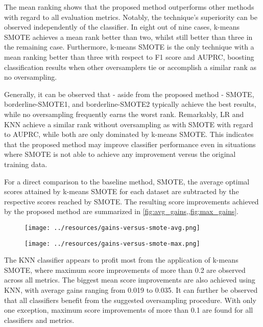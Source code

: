 \documentclass[sort&compress]{elsarticle}
\begin{document}
The mean ranking shows that the proposed method outperforms other methods with regard to all evaluation metrics. Notably, the technique's superiority can be observed independently of the classifier. In eight out of nine cases, k-means \ac{SMOTE} achieves a mean rank better than two, whilst still better than three in the remaining case. Furthermore, k-means \ac{SMOTE} is the only technique with a mean ranking better than three with respect to F1 score and \ac{AUPRC}, boosting classification results when other oversamplers tie or accomplish a similar rank as no oversampling.

Generally, it can be observed that - aside from the proposed method - \ac{SMOTE}, borderline-\ac{SMOTE}1, and borderline-\ac{SMOTE}2 typically achieve the best results, while no oversampling frequently earns the worst rank. Remarkably, \ac{LR} and \ac{KNN} achieve a similar rank without oversampling as with \ac{SMOTE} with regard to \ac{AUPRC}, while both are only dominated by k-means \ac{SMOTE}. This indicates that the proposed method may improve classifier performance even in situations where \ac{SMOTE} is not able to achieve any improvement versus the original training data.

For a direct comparison to the baseline method, \ac{SMOTE}, the average optimal scores attained by k-means \ac{SMOTE} for each dataset are subtracted by the respective scores reached by \ac{SMOTE}. The resulting score improvements achieved by the proposed method are summarized in \cref{fig:avg_gains,,fig:max_gains}.

\begin{figure}[ht]
	\centering
	\begin{minipage}{.48\textwidth}
		\centering
		\texttt{[image: ../resources/gains-versus-smote-avg.png]}
		\label{fig:avg_gains}
	\end{minipage}%
	\hfill
	\begin{minipage}{.48\textwidth}
		\centering
		\texttt{[image: ../resources/gains-versus-smote-max.png]}
		\label{fig:max_gains}
	\end{minipage}
\end{figure}

The \ac{KNN} classifier appears to profit most from the application of k-means \ac{SMOTE}, where maximum score improvements of more than 0.2 are observed across all metrics. The biggest mean score improvements are also achieved using \ac{KNN}, with average gains ranging from 0.019 to 0.035. It can further be observed that all classifiers benefit from the suggested oversampling procedure. With only one exception, maximum score improvements of more than 0.1 are found for all classifiers and metrics.
\end{document}
